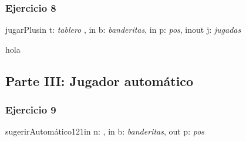 \documentclass[a4paper]{article}
\begin{document}
\subsubsection{Ejercicio 8}
\begin{addmargin}[4em]{1em}
\begin{proc}{jugarPlus}{in t: \textit{tablero} , in b: \textit{banderitas},
	                    in p: \textit{pos},
	                    inout j: \textit{jugadas}}{}{ hola

}

\end{proc}
\end{addmargin}


\newpage
\subsection{Parte III: Jugador autom\'atico}
\subsubsection{Ejercicio 9}
\begin{addmargin}[4em]{1em}
\begin{proc}{sugerirAutom\'atico121}{in n: \ent , in b: \textit{banderitas},
	                                 out p: \textit{pos}}{}

\end{proc}
\end{addmargin}
\end{document}
